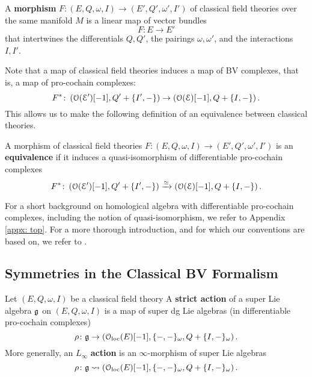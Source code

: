 \documentclass[10pt, oneside]{article}
\begin{document}
\begin{definition}
A {\bf morphism} $F\colon (E, Q, \omega, I) \to (E', Q', \omega', I')$ of classical field theories over the same manifold $M$ is a linear map of vector bundles
\[
F\colon E \to E'
\]
that intertwines the differentials $Q, Q'$, the pairings $\omega, \omega'$, and the interactions $I,I'$. 
\end{definition}

Note that a map of classical field theories induces a map of BV complexes, that is, a map of pro-cochain complexes:
\[
F^*\colon \left(\mathcal O (\mathcal E')[-1], Q' + \{I',-\} \right) \to \left(\mathcal O (\mathcal E)[-1], Q + \{I,-\} \right).
\]
This allows us to make the following definition of an equivalence between classical theories. 

\begin{definition} \label{equivalence_def}
A morphism of classical field theories $F\colon (E, Q, \omega, I) \to (E', Q', \omega', I')$ is an {\bf equivalence} if it induces a quasi-isomorphism of differentiable pro-cochain complexes
\[
F^* \colon  \left(\mathcal O(\mathcal E')[-1], Q' + \{I',-\} \right) \xrightarrow{\simeq} \left(\mathcal O(\mathcal E)[-1], Q + \{I,-\} \right) .
\]
\end{definition}

For a short background on homological algebra with differentiable pro-cochain complexes, including the notion of quasi-isomorphism, we refer to Appendix \ref{appx: top}.
For a more thorough introduction, and for which our conventions are based on, we refer to \cite{Book1}.

\subsection{Symmetries in the Classical BV Formalism} \label{symmetry_section}


\begin{definition} \label{infinitesimal_action_def}
Let $(E, Q,\omega, I)$ be a classical field theory 
A {\bf strict action} of a super Lie algebra $\mathfrak g$ on $(E, Q,\omega, I)$ is a map of super dg Lie algebras (in differentiable pro-cochain complexes)
\[
\rho\colon \mathfrak g \to \left(\mathcal{O}_{\rm loc}(E)[-1] , \{-,-\}_\omega, Q + \{I,-\}_\omega\right) .
\]
More generally, an $L_\infty$ {\bf action} is an $\infty$-morphism of super Lie algebras
\[
\rho\colon \mathfrak g \rightsquigarrow \left(\mathcal{O}_{\rm loc}(E)[-1] , \{-,-\}_\omega, Q + \{I,-\}_\omega\right) .
\]
\end{definition}
\end{document}

